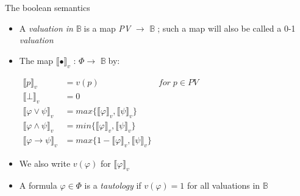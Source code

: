 \documentclass[sans]{beamer}
\begin{document}
\newcommand{\vsem}[1]{\llbracket #1 \rrbracket_v}
\newcommand{\vmsem}[1]{$\llbracket #1 \rrbracket_v$}
\newcommand{\got}[1]{$\mathbb{#1} \;$}
\newcommand{\gotb}{\got{B}}
\newcommand{\cali}[1]{$\mathcal{#1} \;$}
\newcommand{\calr}{\cali{R}}

\begin{frame}{The boolean semantics}
  \begin{itemize}
    \item A \emph{valuation in} \gotb is a map \emph{PV} $\to$ \gotb;
      such a map will also be called a 0-1 \emph{valuation}

    \vfill

    \item The map \vmsem{\bullet} : $\Phi \to$ \gotb by:

      $\begin{aligned}
        \vsem{p} &= v(p) & for \; p \in PV \\
        \vsem{\bot} &= 0 \\
        \vsem{\varphi \vee \psi} &= max\{\vsem{\varphi}, \vsem{\psi}\} \\
        \vsem{\varphi \wedge \psi} &= min\{\vsem{\varphi}, \vsem{\psi}\}\\
        \vsem{\varphi \to \psi} &= max\{1 - \vsem{\varphi}, \vsem{\psi}\}
       \end{aligned}$

    \vfill
    \item We also write $v(\varphi)$ for \vmsem{\varphi}

    \vfill
  \item A formula $\varphi \in \Phi$ is a \emph{tautology} if $v(\varphi) = 1$ for
        all valuations in \gotb
  \end{itemize}
\end{frame}
\end{document}
